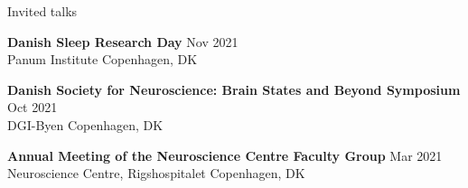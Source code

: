 
\begin{rSection}{Invited talks}

    {\bf Danish Sleep Research Day} \hfill {Nov 2021} \\
	Panum Institute \hfill {Copenhagen, DK}

    {\bf Danish Society for Neuroscience: Brain States and Beyond Symposium} \hfill {Oct 2021} \\
    DGI-Byen \hfill {Copenhagen, DK}
    
    {\bf Annual Meeting of the Neuroscience Centre Faculty Group} \hfill {Mar 2021} \\
	Neuroscience Centre, Rigshospitalet \hfill {Copenhagen, DK}

\end{rSection}
